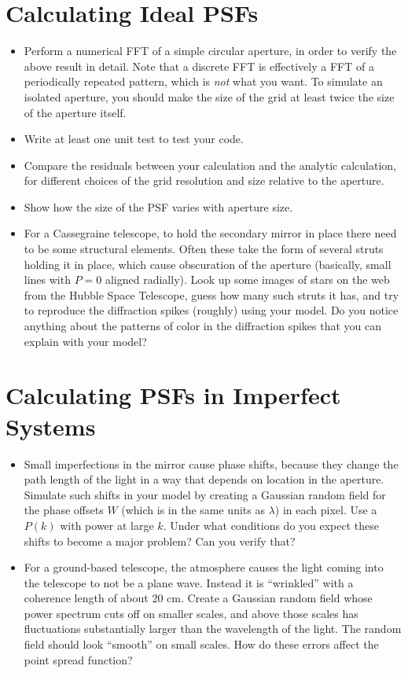 \documentclass[11pt, preprint]{aastex}
\begin{document}
\section{Calculating Ideal PSFs}

\begin{itemize}
\item Perform a numerical FFT of a simple circular aperture, in order
  to verify the above result in detail. Note that a discrete FFT is
  effectively a FFT of a periodically repeated pattern, which is {\it
    not} what you want. To simulate an isolated aperture, you should
  make the size of the grid at least twice the size of the aperture
  itself.
\item Write at least one unit test to test your code.
\item Compare the residuals between your calculation and the analytic
  calculation, for different choices of the grid resolution and size
  relative to the aperture.
\item Show how the size of the PSF varies with aperture size.
\item For a Cassegraine telescope, to hold the secondary mirror in
  place there need to be some structural elements.  Often these take
  the form of several struts holding it in place, which cause
  obscuration of the aperture (basically, small lines with $P=0$
  aligned radially). Look up some images of stars on the web from the
  Hubble Space Telescope, guess how many such struts it has, and try
  to reproduce the diffraction spikes (roughly) using your model. Do
  you notice anything about the patterns of color in the diffraction
  spikes that you can explain with your model?
\end{itemize}

\section{Calculating PSFs in Imperfect Systems}

\begin{itemize} 
\item Small imperfections in the mirror cause phase shifts, because
  they change the path length of the light in a way that depends on
  location in the aperture. Simulate such shifts in your model by
  creating a Gaussian random field for the phase offsets $W$ (which is
  in the same units as $\lambda$) in each pixel. Use a $P(k)$ with
  power at large $k$. Under what conditions do you expect these shifts
  to become a major problem? Can you verify that?
\item For a ground-based telescope, the atmosphere causes the light
  coming into the telescope to not be a plane wave. Instead it is
  ``wrinkled'' with a coherence length of about 20 cm. Create a
  Gaussian random field whose power spectrum cuts off on smaller
  scales, and above those scales has fluctuations substantially larger
  than the wavelength of the light. The random field should look
  ``smooth'' on small scales.  How do these errors affect the point
  spread function?
\end{itemize}
\end{document}
